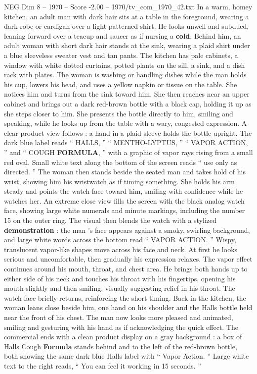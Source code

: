 \begin{textsample}{NEG Dim 8 – 1970 – Score -2.00 – 1970/tv\_com\_1970\_42.txt}  \label{ex:f8_neg_066}
In a warm, homey kitchen, an adult man with dark hair sits at a table in the foreground, wearing a dark robe or cardigan over a light patterned shirt.
He looks unwell and subdued, leaning forward over a teacup and saucer as if nursing a \textbf{cold}.
Behind him, an adult woman with short dark hair stands at the sink, wearing a plaid shirt under a blue sleeveless sweater vest and tan pants.
The kitchen has pale cabinets, a window with white dotted curtains, potted plants on the sill, a sink, and a dish rack with plates.
The woman is washing or handling dishes while the man holds his cup, lowers his head, and uses a yellow napkin or tissue on the table.
She notices him and turns from the sink toward him.
She then reaches near an upper cabinet and brings out a dark red-brown bottle with a black cap, holding it up as she steps closer to him.
She presents the bottle directly to him, smiling and speaking, while he looks up from the table with a wary, congested expression.
A clear product view follows : a hand in a plaid sleeve holds the bottle upright.
The dark blue label reads “ HALLS, ” “ MENTHO-LYPTUS, ” “ VAPOR ACTION, ” and “ COUGH \textbf{FORMULA}, ” with a graphic of vapor rays rising from a small red oval.
Small white text along the bottom of the screen reads “ use only as directed. ” The woman then stands beside the seated man and takes hold of his wrist, showing him his wristwatch as if timing something.
She holds his arm steady and points the watch face toward him, smiling with confidence while he watches her.
An extreme close view fills the screen with the black analog watch face, showing large white numerals and minute markings, including the number 15 on the outer ring.
The visual then blends the watch with a stylized \textbf{demonstration} : the man ’s face appears against a smoky, swirling background, and large white words across the bottom read “ VAPOR ACTION. ” Wispy, translucent vapor-like shapes move across his face and neck.
At first he looks serious and uncomfortable, then gradually his expression relaxes.
The vapor effect continues around his mouth, throat, and chest area.
He brings both hands up to either side of his neck and touches his throat with his fingertips, opening his mouth slightly and then smiling, visually suggesting relief in his throat.
The watch face briefly returns, reinforcing the short timing.
Back in the kitchen, the woman leans close beside him, one hand on his shoulder and the Halls bottle held near the front of his chest.
The man now looks more pleased and animated, smiling and gesturing with his hand as if acknowledging the quick effect.
The commercial ends with a clean product display on a gray background : a box of Halls Cough \textbf{Formula} stands behind and to the left of the red-brown bottle, both showing the same dark blue Halls label with “ Vapor Action. ” Large white text to the right reads, “ You can feel it working in 15 seconds. ”

\end{textsample}
